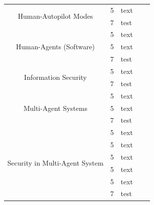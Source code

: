 \documentclass[runningheads,a4paper]{llncs}
\begin{document}
\begin{longtable}{|c|c|p{5cm}|p{3cm}|p{1cm}|}
	\multirow{2}{*}{Human-Autopilot Modes}    
	& 5     
	& text                            
	&                                 
	&                       
	\\ \cline{2-5} 
	& 7     
	& test                            
	&                                 
	&                       
	\\ \hline
	
	\multirow{3}{*}{Human-Agents (Software) } 
	& 5     
	& text                            
	&                                 
	&                       
	\\ \cline{2-5}
	& 5     
	& text                            
	&                                 
	&                       
	\\ \cline{2-5} 
	& 7     
	& test                            
	&                                 
	&                       
	\\ \hline
	
	\multirow{2}{*}{Information Security } 
	& 5     
	& text                            
	&                                 
	&                       
	\\ \cline{2-5} 
	& 7     
	& test                            
	&                                 
	&                       
	\\ \hline
	
	\multirow{3}{*}{Multi-Agent Systems }
	& 5     
	& text                            
	&                                 
	&                       
	\\ \cline{2-5}
	& 5     
	& text                            
	&                                 
	&                       
	\\ \cline{2-5} 
	& 7     
	& test                            
	&                                 
	&                       
	\\ \hline
	\multirow{6}{*}{Security in Multi-Agent System}
	& 5     
	& text                            
	&                                 
	&                       
	\\ \cline{2-5} 
	& 5     
	& text                            
	&                                 
	&                       
	\\ \cline{2-5}
	& 5     
	& text                            
	&                                 
	&                       
	\\ \cline{2-5} 
	& 5     
	& text                            
	&                                 
	&                       
	\\ \cline{2-5}
	& 5     
	& text                            
	&                                 
	&                       
	\\ \cline{2-5} 
	& 7     
	& test                            
	&                                 
	&                       
	\\ \hline
	

\end{longtable}
\end{document}
